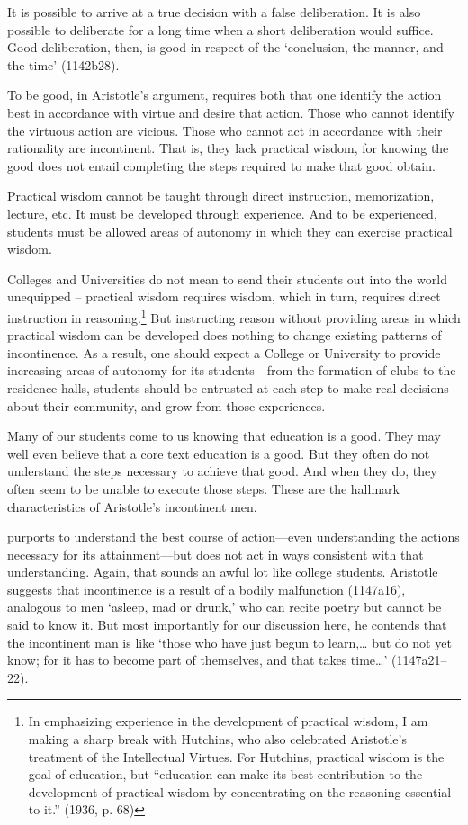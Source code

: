 It is possible to arrive at a true decision with a false deliberation. It is also possible to deliberate for a long time when a short deliberation would suffice. Good deliberation, then, is good in respect of the `conclusion, the manner, and the time' (1142b28).

To be good, in Aristotle's argument, requires both that one identify the action best in accordance with virtue and desire that action. Those who cannot identify the virtuous action are vicious. Those who cannot act in accordance with their rationality are incontinent. That is, they lack practical wisdom, for knowing the good does not entail completing the steps required to make that good obtain. 

Practical wisdom cannot be taught through direct instruction, memorization, lecture, etc. It must be developed through experience. And to be experienced, students must be allowed areas of autonomy in which they can exercise practical wisdom. 

Colleges and Universities do not mean to send their students out into the world unequipped – practical wisdom requires wisdom, which in turn, requires direct instruction in reasoning.\footnote{In emphasizing experience in the development of practical wisdom, I am making a sharp break with Hutchins, who also celebrated Aristotle's treatment of the Intellectual Virtues. For Hutchins, practical wisdom is the goal of education, but ``education can make its best contribution to the development of practical wisdom by concentrating on the reasoning essential to it.'' (1936, p. 68)} But instructing reason without providing areas in which practical wisdom can be developed does nothing to change existing patterns of incontinence. As a result, one should expect a College or University to provide increasing areas of autonomy for its students---from the formation of clubs to the residence halls, students should be entrusted at each step to make real decisions about their community, and grow from those experiences.

Many of our students come to us knowing that education is a good. They may well even believe that a core text education is a good. But they often do not understand the steps necessary to achieve that good. And when they do, they often seem to be unable to execute those steps. These are the hallmark characteristics of Aristotle's incontinent men.

 purports to understand the best course of action---even understanding the actions necessary for its attainment---but does not act in ways consistent with that understanding. Again, that sounds an awful lot like college students. Aristotle suggests that incontinence is a result of a bodily malfunction (1147a16), analogous to men `asleep, mad or drunk,' who can recite poetry but cannot be said to know it. But most importantly for our discussion here, he contends that the incontinent man is like `those who have just begun to learn,{\ldots} but do not yet know; for it has to become part of themselves, and that takes time{\ldots}' (1147a21--22).

